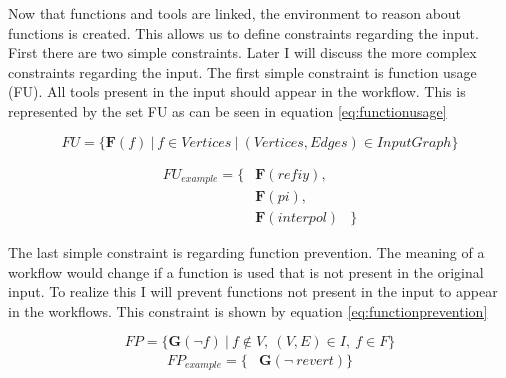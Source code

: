 \documentclass{article}
\begin{document}
Now that functions and tools are linked, the environment to reason about functions is created. This allows us to define constraints regarding the input. First there are two simple constraints. Later I will discuss the more complex constraints regarding the input. The first simple constraint is function usage (FU). All tools present in the input should appear in the workflow. This is represented by the set FU as can be seen in equation \ref{eq:functionusage}


\begin{equation}
    FU = \{ \textbf{F}(f)\ |\ f \in Vertices\ |\ (Vertices,Edges) \in InputGraph \}
    \label{eq:functionusage}
\end{equation}

\begin{align*}
    FU_{example}=\{& \textbf{F}(refiy), \\
    &\textbf{F}(pi), \\
    & \textbf{F}(interpol)& \}
\end{align*}

The last simple constraint is regarding function prevention. The meaning of a workflow would change if a function is used that is not present in the original input. To realize this I will prevent functions not present in the input to appear in the workflows. This constraint is shown by equation \ref{eq:functionprevention}

\begin{equation}
    FP = \{ \textbf{G}(\neg f)    \ |\ f \notin V,\ (V,E) \in I,\ f \in F\} \label{eq:functionprevention}
\end{equation}
\begin{align*}
    FP_{example} = \{& \textbf{G}(\neg\ revert)\} 
\end{align*}



\end{document}

